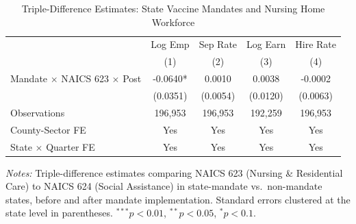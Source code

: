 \begin{table}[htbp]
\centering
\caption{Triple-Difference Estimates: State Vaccine Mandates and Nursing Home Workforce}
\label{tab:ddd}
\begin{threeparttable}
\begin{tabular}{lcccc}
\hline\hline
 & Log Emp & Sep Rate & Log Earn & Hire Rate \\
 & (1) & (2) & (3) & (4) \\
\hline
Mandate $\times$ NAICS 623 $\times$ Post & -0.0640* & 0.0010 & 0.0038 & -0.0002 \\
  & (0.0351) & (0.0054) & (0.0120) & (0.0063) \\
Observations & 196,953 & 196,953 & 192,259 & 196,953 \\
County-Sector FE & Yes & Yes & Yes & Yes \\
State $\times$ Quarter FE & Yes & Yes & Yes & Yes \\
\hline\hline
\end{tabular}
\begin{tablenotes}[flushleft]
\small
\item \textit{Notes:} Triple-difference estimates comparing NAICS 623 (Nursing \& Residential Care) to NAICS 624 (Social Assistance) in state-mandate vs.\ non-mandate states, before and after mandate implementation. Standard errors clustered at the state level in parentheses. $^{***}p<0.01$, $^{**}p<0.05$, $^{*}p<0.1$.
\end{tablenotes}
\end{threeparttable}
\end{table}
